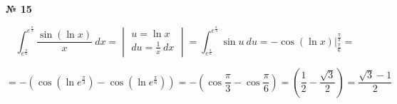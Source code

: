 \documentclass{article}
\begin{document}
\textbf{№ 15} 
\large

$$ \int_{e^{\frac{\pi}{6}}}^{e^{\frac{\pi}{3}}} \frac{\sin{(\ln{x})}}{x} \ dx 
=  \begin{vmatrix} u = \ln{x} \\
                  du = \frac{1}{x} \ dx \end{vmatrix}
= \int_{e^{\frac{\pi}{6}}}^{e^{\frac{\pi}{3}}} \sin{u} \ du 
= - \cos{(\ln{x})} \bigg\vert_{\frac{\pi}{6}}^{\frac{\pi}{3}}
= $$

$$ = -\left( \cos{(\ln{e^{\frac{\pi}{3}}})} - \cos{(\ln{e^{\frac{\pi}{6}}})} \right)
= -\left( \cos{\frac{\pi}{3}} - \cos{\frac{\pi}{6}} \right)
= \left( \frac{1}{2} - \frac{\sqrt{3}}{2} \right) 
= \frac{\sqrt{3}-1}{2} $$
\end{document}
